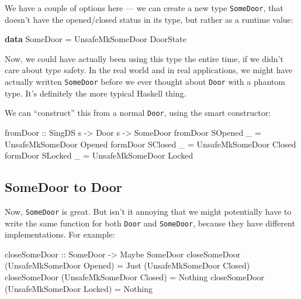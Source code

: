 \documentclass[]{article}
\newenvironment{Shaded}{}{}
\newcommand{\KeywordTok}[1]{\textcolor[rgb]{0.00,0.44,0.13}{\textbf{#1}}}
\newcommand{\DataTypeTok}[1]{\textcolor[rgb]{0.56,0.13,0.00}{#1}}
\newcommand{\OtherTok}[1]{\textcolor[rgb]{0.00,0.44,0.13}{#1}}
\newcommand{\FunctionTok}[1]{\textcolor[rgb]{0.02,0.16,0.49}{#1}}
\newcommand{\NormalTok}[1]{#1}
\begin{document}
We have a couple of options here --- we can create a new type \texttt{SomeDoor},
that doesn't have the opened/closed status in its type, but rather as a runtime
value:

\begin{Shaded}
\begin{Highlighting}[]
\KeywordTok{data} \DataTypeTok{SomeDoor} \FunctionTok{=} \DataTypeTok{UnsafeMkSomeDoor} \DataTypeTok{DoorState}
\end{Highlighting}
\end{Shaded}

Now, we could have actually been using this type the entire time, if we didn't
care about type safety. In the real world and in real applications, we might
have actually written \texttt{SomeDoor} before we ever thought about
\texttt{Door} with a phantom type. It's definitely the more typical Haskell
thing.

We can ``construct'' this from a normal \texttt{Door}, using the smart
constructor:

\begin{Shaded}
\begin{Highlighting}[]
\OtherTok{fromDoor ::} \DataTypeTok{SingDS}\NormalTok{ s }\OtherTok{->} \DataTypeTok{Door}\NormalTok{ s }\OtherTok{->} \DataTypeTok{SomeDoor}
\NormalTok{fromDoor }\DataTypeTok{SOpened}\NormalTok{ _ }\FunctionTok{=} \DataTypeTok{UnsafeMkSomeDoor} \DataTypeTok{Opened}
\NormalTok{formDoor }\DataTypeTok{SClosed}\NormalTok{ _ }\FunctionTok{=} \DataTypeTok{UnsafeMkSomeDoor} \DataTypeTok{Closed}
\NormalTok{formDoor }\DataTypeTok{SLocked}\NormalTok{ _ }\FunctionTok{=} \DataTypeTok{UnsafeMkSomeDoor} \DataTypeTok{Locked}
\end{Highlighting}
\end{Shaded}

\subsection{SomeDoor to Door}\label{somedoor-to-door}

Now, \texttt{SomeDoor} is great. But isn't it annoying that we might potentially
have to write the same function for both \texttt{Door} and \texttt{SomeDoor},
because they have different implementations. For example:

\begin{Shaded}
\begin{Highlighting}[]
\OtherTok{closeSomeDoor ::} \DataTypeTok{SomeDoor} \OtherTok{->} \DataTypeTok{Maybe} \DataTypeTok{SomeDoor}
\NormalTok{closeSomeDoor (}\DataTypeTok{UnsafeMkSomeDoor} \DataTypeTok{Opened}\NormalTok{) }\FunctionTok{=} \DataTypeTok{Just}\NormalTok{ (}\DataTypeTok{UnsafeMkSomeDoor} \DataTypeTok{Closed}\NormalTok{)}
\NormalTok{closeSomeDoor (}\DataTypeTok{UnsafeMkSomeDoor} \DataTypeTok{Closed}\NormalTok{) }\FunctionTok{=} \DataTypeTok{Nothing}
\NormalTok{closeSomeDoor (}\DataTypeTok{UnsafeMkSomeDoor} \DataTypeTok{Locked}\NormalTok{) }\FunctionTok{=} \DataTypeTok{Nothing}
\end{Highlighting}
\end{Shaded}
\end{document}

